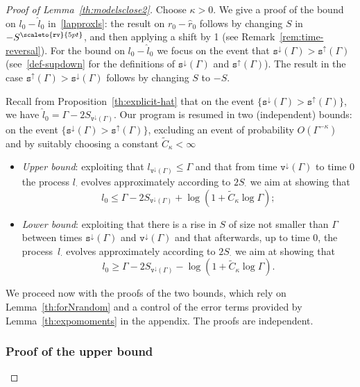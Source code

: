 \documentclass[10pt]{amsart}
\theoremstyle{definition}\newtheorem{defi}[theo]{Definition}\newtheorem{rema}[theo]{Remark}\newtheorem{exam}[theo]{Example}\newtheorem{exem}[theo]{Example}\newtheorem{nota}[theo]{Notation}
\newcommand{\gG}{\Gamma}
\newcommand{\ts}{\mathtt{s}}
\newcommand{\tsdown}{\ts^\downarrow}
\newcommand{\tsup}{\ts^\uparrow}
\newcommand{\ttv}{\mathtt{v}}
\newcommand{\tvdown}{\ttv^\downarrow}
\newcommand\mystrut{\rule{0pt}{6pt}}
\newcommand{\Srev}{S\mystrut^{\scaleto{\mathtt{rv}\mathstrut}{5pt}}}
\newcommand{\ls}{\widehat{l}}
\newcommand{\rs}{\widehat{r}}
\begin{document}
\begin{proof}[Proof of Lemma~\ref{th:modelsclose2}]
Choose $\kappa>0$. We give a proof of the bound on $ l_0-\ls_0$ in~\eqref{lapproxls}: the result on $r_0-\rs_0$ follows by changing $S$ in $-\Srev$, and then applying a shift by 1 (see Remark~\ref{rem:time-reversal}). For the bound on $ l_0-\ls_0$ we focus on the event that $\tsdown(\gG)>\tsup(\gG)$ (see~\eqref{def-supdown} for the definitions of $\tsdown(\gG)$ and $\tsup(\gG)$). The result in the case $\tsup(\gG)>\tsdown(\gG)$ follows by changing $S$ to $-S$.


Recall from Proposition~\ref{th:explicit-hat} that on the event $\{\tsdown(\Gamma)>\tsup(\Gamma)\}$, we have $\ls_0=\gG-2 S_{\tvdown(\gG)}$. Our program is resumed in two (independent) bounds: on the event $\{\tsdown(\Gamma)>\tsup(\Gamma)\}$, excluding an event of probability $O(\gG^{-\kappa})$ and by suitably choosing a constant $\widetilde{C}_\kappa<\infty$
\begin{itemize}
\item \emph{Upper bound}: exploiting that $l_{\tvdown(\gG)}\le \gG$ and that from time $\tvdown(\gG)$ to time 0 the process $l_\cdot $ evolves approximately according to $2 S_\cdot$ we aim at showing that
\begin{equation}\label{eq:upp-lv}
l_0\le \gG-2 S_{\tvdown(\gG)}+\log\left(1+\widetilde{C}_\kappa\log \gG\right);
\end{equation}
\item \emph{Lower bound}: exploiting that there is a rise in $S$ of size not smaller than $\gG$ between times $\tsdown(\Gamma)$ and $\tvdown(\gG)$ and that afterwards, up to time 0, the process~$l_\cdot $ evolves approximately according to $2 S_\cdot$ we aim at showing that
\begin{equation}\label{eq:low-lv}
l_0 \ge \gG-2 S_{\tvdown(\gG)}-\log\left(1+\widetilde{C}_\kappa\log \gG\right).
\end{equation}
\end{itemize}



We proceed now with the proofs of the two bounds, which rely on Lemma~\ref{th:forNrandom} and a control of the error terms provided by Lemma~\ref{th:expomoments} in the appendix. The proofs are independent.

\subsubsection{Proof of the upper bound}


\end{proof}
\end{document}
